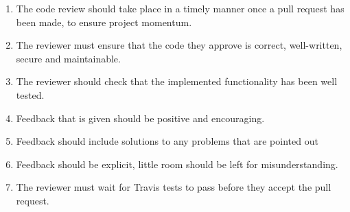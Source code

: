 \documentclass[10pt,onecolumn]{witseiepaper}
\begin{document}
\begin{enumerate}
	\item The code review should take place in a timely manner once a pull request has been made, to ensure project momentum.
	\item The reviewer must ensure that the code they approve is correct, well-written, secure and maintainable.
	\item The reviewer should check that the implemented functionality has been well tested.
	\item Feedback that is given should be positive and encouraging.
	\item Feedback should include solutions to any problems that are pointed out
	\item Feedback should be explicit, little room should be left for misunderstanding.
	\item The reviewer must wait for Travis tests to pass before they accept the pull request.
	
	
\end{enumerate}
\end{document}
